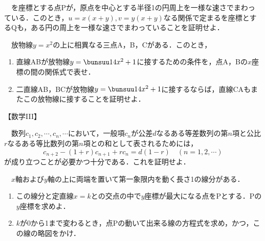 \begin{problem}
  　を座標とする点Pが，原点を中心とする半径1の円周上を一様な速さでまわっている．このとき，$u = x(x+y), v = y(x+y)$なる関係で定まるを座標とするQも，ある円の周上を一様な速さでまわっていることを証明せよ．
\end{problem}
\begin{problem}
  　放物線$y=x^2$の上に相異なる三点A，B，Cがある．このとき，
  \begin{enumerate}
    \item 直線ABが放物線$y = \bunsuu14 x^2+ 1$に接するための条件を，点A，Bの$x$座標の間の関係式で表せ．
    \item 二直線AB，BCが放物線$y = \bunsuu14x^2 + 1$に接するならば，直線CAもまたこの放物線に接することを証明せよ．
  \end{enumerate}
\end{problem}


\begin{center}
  【数学III】
\end{center}
\begin{problem}
  　数列$c_1,c_2,\cdots,c_n,\cdots$において，一般項$c_n$が公差$d$なるある等差数列の第$n$項と公比$r$なるある等比数列の第$n$項との和として表されるためには，
  \[c_{n+2} - (1+r)c_{n+1} + rc_n = d(1-r)\quad (n=1,2,\cdots)\]
  が成り立つことが必要かつ十分である．これを証明せよ．
\end{problem}
\begin{problem}
  　$x$軸および$y$軸の上に両端を置いて第一象限内を動く長さ1の線分がある．
  \begin{enumerate}
    \item この線分と定直線$x=k$との交点の中で$y$座標が最大になる点をPとする．Pの$y$座標を求めよ．
    \item $k$が0から1まで変わるとき，点Pの動いて出来る線の方程式を求め，かつ，この線の略図をかけ．
  \end{enumerate}
\end{problem}
